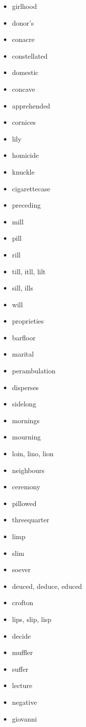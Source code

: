 \documentclass{article}
\begin{document}
\begin{itemize}
    \item girlhood
    \item donor's
    \item conacre
    \item constellated
    \item domestic
    \item concave
    \item apprehended
    \item cornices
    \item lily
    \item homicide
    \item knuckle
    \item cigarettecase
    \item preceding
    \item mill
    \item pill
    \item rill
    \item till, itll, lilt
    \item sill, ills
    \item will
    \item proprieties
    \item barfloor
    \item marital
    \item perambulation
    \item disperses
    \item sidelong
    \item mornings
    \item mourning
    \item loin, lino, lion
    \item neighbours
    \item ceremony
    \item pillowed
    \item threequarter
    \item limp
    \item slim
    \item soever
    \item deuced, deduce, educed
    \item crofton
    \item lips, slip, lisp
    \item decide
    \item muffler
    \item suffer
    \item lecture
    \item negative
    \item giovanni

\end{itemize}
\end{document}
